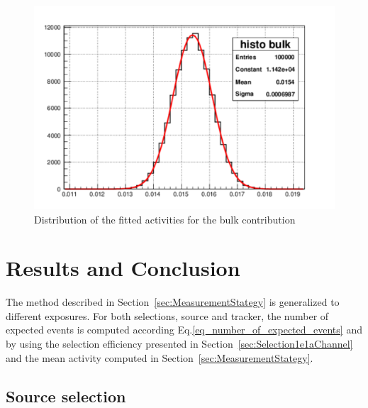 \documentclass[main.tex]{subfiles}
\begin{document}
\begin{figure}[h!]
\begin{center}
\includegraphics[scale=0.5]{pictures/Chap5/gaussian_bulk_activity.pdf}
\caption{Distribution of the fitted activities for the bulk contribution}
\label{gaus}
\end{center}
\end{figure}


\FloatBarrier




\section{Results and Conclusion}\label{sec:Results}


\noindent The method described in Section~\ref{sec:MeasurementStategy} is generalized to different exposures. For both selections, source and tracker, the number of expected events is computed according Eq.\ref{eq_number_of_expected_events} and by using the selection efficiency presented in Section~\ref{sec:Selection1e1aChannel} and the mean activity computed in Section~\ref{sec:MeasurementStategy}.


\subsection{Source selection}
\end{document}
